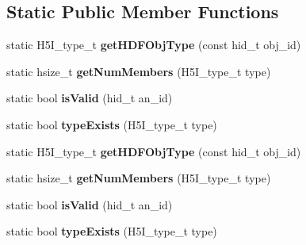 \subsection*{Static Public Member Functions}
\begin{DoxyCompactItemize}
\item 
\mbox{\label{class_h5_1_1_id_component_a63cba3ef976ada4c0fec47d5b38633bc}} 
static H5\+I\+\_\+type\+\_\+t {\bfseries get\+H\+D\+F\+Obj\+Type} (const hid\+\_\+t obj\+\_\+id)
\item 
\mbox{\label{class_h5_1_1_id_component_a97583f6ebcd77bc1b8a03bc6a28b2b66}} 
static hsize\+\_\+t {\bfseries get\+Num\+Members} (H5\+I\+\_\+type\+\_\+t type)
\item 
\mbox{\label{class_h5_1_1_id_component_ad820c7fe00e96c8924a1aac1884a5631}} 
static bool {\bfseries is\+Valid} (hid\+\_\+t an\+\_\+id)
\item 
\mbox{\label{class_h5_1_1_id_component_ae7a9238de4922e4a31e80568cbe20412}} 
static bool {\bfseries type\+Exists} (H5\+I\+\_\+type\+\_\+t type)
\item 
\mbox{\label{class_h5_1_1_id_component_a63cba3ef976ada4c0fec47d5b38633bc}} 
static H5\+I\+\_\+type\+\_\+t {\bfseries get\+H\+D\+F\+Obj\+Type} (const hid\+\_\+t obj\+\_\+id)
\item 
\mbox{\label{class_h5_1_1_id_component_a97583f6ebcd77bc1b8a03bc6a28b2b66}} 
static hsize\+\_\+t {\bfseries get\+Num\+Members} (H5\+I\+\_\+type\+\_\+t type)
\item 
\mbox{\label{class_h5_1_1_id_component_ad820c7fe00e96c8924a1aac1884a5631}} 
static bool {\bfseries is\+Valid} (hid\+\_\+t an\+\_\+id)
\item 
\mbox{\label{class_h5_1_1_id_component_ae7a9238de4922e4a31e80568cbe20412}} 
static bool {\bfseries type\+Exists} (H5\+I\+\_\+type\+\_\+t type)
\end{DoxyCompactItemize}
